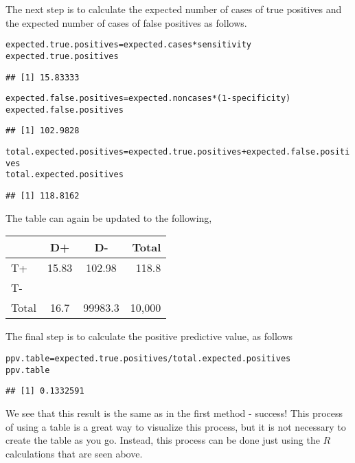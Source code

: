 \documentclass[11pt]{article}\usepackage[]{graphicx}\usepackage[]{color}
\makeatletter
\newcommand{\hlnum}[1]{\textcolor[rgb]{0.686,0.059,0.569}{#1}}%
\newcommand{\hlopt}[1]{\textcolor[rgb]{0,0,0}{#1}}%
\newcommand{\hlstd}[1]{\textcolor[rgb]{0.345,0.345,0.345}{#1}}%
\newcommand{\hlkwb}[1]{\textcolor[rgb]{0.69,0.353,0.396}{#1}}%
\newenvironment{kframe}{%
 \def\at@end@of@kframe{}%
 \ifinner\ifhmode%
  \def\at@end@of@kframe{\end{minipage}}%
  \begin{minipage}{\columnwidth}%
 \fi\fi%
 \def\FrameCommand##1{\hskip\@totalleftmargin \hskip-\fboxsep
 \colorbox{shadecolor}{##1}\hskip-\fboxsep
     \hskip-\linewidth \hskip-\@totalleftmargin \hskip\columnwidth}%
 \MakeFramed {\advance\hsize-\width
   \@totalleftmargin\z@ \linewidth\hsize
   \@setminipage}}%
 {\par\unskip\endMakeFramed%
 \at@end@of@kframe}
\newenvironment{knitrout}{}{} %
\makeatother
\begin{document}
The next step is to calculate the expected number of cases of true positives and the expected number of cases of false positives as follows.  
\begin{knitrout}
\color{fgcolor}\begin{kframe}
\begin{alltt}
\hlstd{expected.true.positives} \hlkwb{=} \hlstd{expected.cases} \hlopt{*} \hlstd{sensitivity}
\hlstd{expected.true.positives}
\end{alltt}
\begin{verbatim}
## [1] 15.83333
\end{verbatim}
\begin{alltt}
\hlstd{expected.false.positives} \hlkwb{=} \hlstd{expected.noncases} \hlopt{*} \hlstd{(}\hlnum{1} \hlopt{-} \hlstd{specificity)}
\hlstd{expected.false.positives}
\end{alltt}
\begin{verbatim}
## [1] 102.9828
\end{verbatim}
\begin{alltt}
\hlstd{total.expected.positives} \hlkwb{=} \hlstd{expected.true.positives} \hlopt{+} \hlstd{expected.false.positives}
\hlstd{total.expected.positives}
\end{alltt}
\begin{verbatim}
## [1] 118.8162
\end{verbatim}
\end{kframe}
\end{knitrout}
The table can again be updated to the following, 
\begin{center}
\begin{tabular}{|l|c|c|r|}
\hline 
& D+ & D- & Total\\ 
\hline
T+ & 15.83 & 102.98 & 118.8\\ 
\hline
T- & & & \\ 
\hline 
Total & 16.7 & 99983.3 & 10,000 \\ 
\hline 
\end{tabular} 
\end{center}

The final step is to calculate the positive predictive value, as follows 
\begin{knitrout}
\color{fgcolor}\begin{kframe}
\begin{alltt}
\hlstd{ppv.table} \hlkwb{=} \hlstd{expected.true.positives}\hlopt{/}\hlstd{total.expected.positives}
\hlstd{ppv.table}
\end{alltt}
\begin{verbatim}
## [1] 0.1332591
\end{verbatim}
\end{kframe}
\end{knitrout}
We see that this result is the same as in the first method - success!  This process of using a table is a great way to visualize this process, but it is not necessary to create the table as you go.  Instead, this process can be done just using the $R$ calculations that are seen above.  
\end{document}
